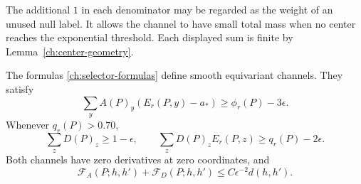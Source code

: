The additional $1$ in each denominator may be regarded as the weight of an
unused null label.  It allows the channel to have small total mass when no
center reaches the exponential threshold.  Each displayed sum is finite by
Lemma~\ref{ch:center-geometry}.

\begin{lemma}
\label{ch:selector-estimates}
The formulas \eqref{ch:selector-formulas} define smooth equivariant
channels.  They satisfy
\begin{equation}
 \sum_y A(P)_y(E_r(P,y)-a_*)\ge\phi_r(P)-3\epsilon.
 \label{ch:selector-concentration}
\end{equation}
Whenever $q_r(P)>0.70$,
\begin{equation}
 \sum_zD(P)_z\ge1-\epsilon,
 \qquad
 \sum_zD(P)_zE_r(P,z)\ge q_r(P)-2\epsilon.
 \label{ch:D-concentration}
\end{equation}
Both channels have zero derivatives at zero coordinates, and
\begin{equation}
 \mathcal F_A(P;h,h')+\mathcal F_D(P;h,h')
       \le C\epsilon^{-2}d(h,h').
 \label{ch:selector-fisher}
\end{equation}
\end{lemma}

